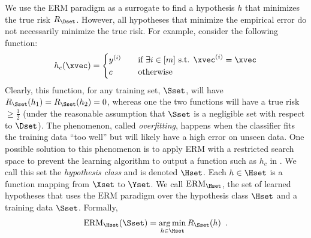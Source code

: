We use the ERM paradigm as a surrogate to find a hypothesis $h$ that minimizes the true risk $R_\Dset$.
However, all hypotheses that minimize the empirical error do not necessarily minimize the true risk.
For example, consider the following function:
\begin{equation} \label{equation:ch2-perfect_function}
  h_c(\xvec) =
  \begin{cases}
    y^{(i)} &\quad \text{if }\exists i \in [m] \text{ s.t. } \xvec^{(i)} = \xvec \\
    c &\quad \text{otherwise}
  \end{cases}
\end{equation}
Clearly, this function, for any training set, $\Sset$, will have $R_\Sset(h_1) = R_\Sset(h_2) = 0$, whereas one the two functions will have a true risk $\geq \frac{1}{2}$ (under the reasonable assumption that $\Sset$ is a negligible set with respect to $\Dset$).
The phenomenon, called \emph{overfitting}, happens when the classifier fits the training data ``too well'' but will likely have a high error on unseen data.
One possible solution to this phenomenon is to apply ERM with a restricted search space to prevent the learning algorithm to output a function such as $h_c$ in .
We call this set the \emph{hypothesis class} and is denoted $\Hset$.
Each $h \in \Hset$ is a function mapping from $\Xset$ to $\Yset$.
We call $\mathrm{ERM}_{\Hset}$, the set of learned hypotheses that uses the $\mathrm{ERM}$ paradigm over the hypothesis class $\Hset$ and a training data $\Sset$.
Formally,
\begin{equation}
  \mathrm{ERM}_{\Hset}(\Sset) = \argmin_{h \in \Hset} R_{\Sset}(h) \enspace.
\end{equation}


